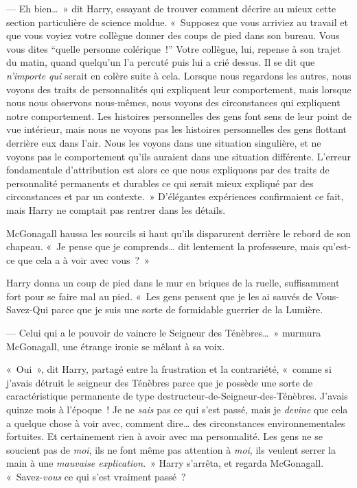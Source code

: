 --- Eh bien…~» dit Harry, essayant de trouver comment décrire au mieux cette section particulière de science moldue. «~Supposez que vous arriviez au travail et que vous voyiez votre collègue donner des coups de pied dans son bureau. Vous vous dites ``quelle personne colérique~!'' Votre collègue, lui, repense à son trajet du matin, quand quelqu'un l'a percuté puis lui a crié dessus. Il se dit que \emph{n'importe qui} serait en colère suite à cela. Lorsque nous regardons les autres, nous voyons des traits de personnalités qui expliquent leur comportement, mais lorsque nous nous observons nous-mêmes, nous voyons des circonstances qui expliquent notre comportement. Les histoires personnelles des gens font sens de leur point de vue intérieur, mais nous ne voyons pas les histoires personnelles des gens flottant derrière eux dans l'air. Nous les voyons dans une situation singulière, et ne voyons pas le comportement qu'ils auraient dans une situation différente. L'erreur fondamentale d'attribution est alors ce que nous expliquons par des traits de personnalité permanents et durables ce qui serait mieux expliqué par des circonstances et par un contexte.~» D'élégantes expériences confirmaient ce fait, mais Harry ne comptait pas rentrer dans les détails.

McGonagall haussa les sourcils si haut qu'ils disparurent derrière le rebord de son chapeau. «~Je pense que je comprends… dit lentement la professeure, mais qu'est-ce que cela a à voir avec vous~?~»

Harry donna un coup de pied dans le mur en briques de la ruelle, suffisamment fort pour se faire mal au pied. «~Les gens pensent que je les ai sauvés de Vous-Savez-Qui parce que je suis une sorte de formidable guerrier de la Lumière.

--- Celui qui a le pouvoir de vaincre le Seigneur des Ténèbres…~» murmura McGonagall, une étrange ironie se mêlant à sa voix.

«~Oui~», dit Harry, partagé entre la frustration et la contrariété, «~comme si j'avais détruit le seigneur des Ténèbres parce que je possède une sorte de caractéristique permanente de type destructeur-de-Seigneur-des-Ténèbres. J'avais quinze mois à l'époque~! Je ne \emph{sais} pas ce qui s'est passé, mais je \emph{devine} que cela a quelque chose à voir avec, comment dire… des circonstances environnementales fortuites. Et certainement rien à avoir avec ma personnalité. Les gens ne se soucient pas de \emph{moi}, ils ne font même pas attention à \emph{moi}, ils veulent serrer la main à une \emph{mauvaise explication}.~» Harry s'arrêta, et regarda McGonagall. «~Savez-\emph{vous} ce qui s'est vraiment passé~?

